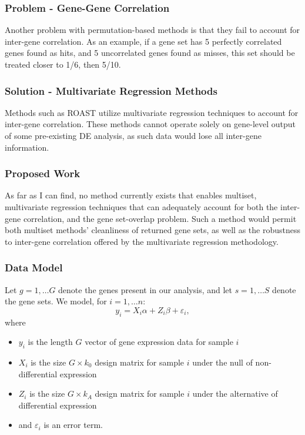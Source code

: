 \documentclass{beamer}
\begin{document}
\begin{frame}
  \frametitle{Problem - Gene-Gene Correlation}

  Another problem with permutation-based methods is that they fail to account for inter-gene correlation.
  As an example, if a gene set has 5 perfectly correlated genes found as hits, and 5 uncorrelated genes found as misses, this set should be treated closer to 1/6, then 5/10.

\end{frame}


\begin{frame}
  \frametitle{Solution - Multivariate Regression Methods}

  Methods such as ROAST utilize multivariate regression techniques to account for inter-gene correlation.
  These methods cannot operate solely on gene-level output of some pre-existing DE analysis, as such data would lose all inter-gene information. 
\end{frame}

\begin{frame}
  \frametitle{Proposed Work}

  As far as I can find, no method currently exists that enables multiset, multivariate regression techniques that can adequately account for both the inter-gene correlation, and the gene set-overlap problem. 
  Such a method would permit both multiset methods' cleanliness of returned gene sets, as well as the robustness to inter-gene correlation offered by the multivariate regression methodology. 
\end{frame}

\begin{frame}
  \frametitle{Data Model}
  Let $g = 1,\ldots G$ denote the genes present in our analysis, and let $s = 1, \ldots S$ denote the gene sets.
  We model, for $i = 1, \ldots n$:
  \[
    y_{i} = X_i\alpha + Z_i\beta + \varepsilon_i,
  \]
  where
  \begin{itemize}
    \item $y_i$ is the length $G$ vector of gene expression data for sample $i$
    \item $X_i$ is the size $G\times k_0$ design matrix for sample $i$ under the null of non-differential expression
    \item $Z_i$ is the size $G\times k_A$ design matrix for sample $i$ under the alternative of differential expression
    \item and $\varepsilon_i$ is an error term.
  \end{itemize}
\end{frame}
\end{document}
